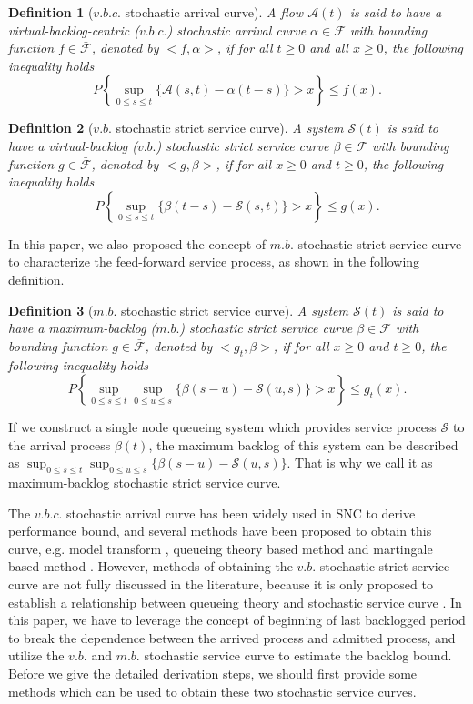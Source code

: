 \documentclass[12pt]{article}
\newtheorem{definition}{Definition}
\begin{document}
\begin{definition}[$v.b.c.$ stochastic arrival curve]
A flow $\mathcal{A}(t)$ is said to have a virtual-backlog-centric ($v.b.c.$) stochastic arrival curve $\alpha\in\mathcal{F}$ with bounding function $f\in\bar{\mathcal{F}}$, denoted by $<f,\alpha>$, if for all $t\geq 0$ and all $x\geq 0$, the following inequality holds
$$P\left\{\sup_{0\leq s\leq t}\{\mathcal{A}(s,t)-\alpha(t-s)\}>x\right\}\leq f(x).$$
\end{definition}

\begin{definition}[$v.b.$ stochastic strict service curve]
A system $\mathcal{S}(t)$ is said to have a virtual-backlog ($v.b.$) stochastic strict service curve $\beta\in\mathcal{F}$ with bounding function $g\in\bar{\mathcal{F}}$, denoted by $<g,\beta>$, if for all $x\geq 0$ and $t\geq 0$, the following inequality holds
$$P\left\{\sup_{0\leq s\leq t}\{\beta(t-s)-\mathcal{S}(s,t)\}>x\right\}\leq g(x).$$
\end{definition}

In this paper, we also proposed the concept of $m.b.$ stochastic strict service curve to characterize the feed-forward service process, as shown in the following definition.
\begin{definition}[$m.b.$ stochastic strict service curve]
A system $\mathcal{S}(t)$ is said to have a maximum-backlog ($m.b.$) stochastic strict service curve $\beta\in\mathcal{F}$ with bounding function $g\in\bar{\mathcal{F}}$, denoted by $<g_t,\beta>$, if for all $x\geq 0$ and $t\geq 0$, the following inequality holds
$$P\left\{\sup_{0\leq s\leq t}\sup_{0\leq u\leq s}\{\beta(s-u)-\mathcal{S}(u,s)\}>x\right\}\leq g_t(x).$$
\end{definition}

If we construct a single node queueing system which provides service process $\mathcal{S}$ to the arrival process $\beta(t)$, the maximum backlog of this system can be described as $\sup_{0\leq s\leq t}\sup_{0\leq u\leq s}\{\beta(s-u)-\mathcal{S}(u,s)\}$. That is why we call it as maximum-backlog stochastic strict service curve.

The $v.b.c.$ stochastic arrival curve has been widely used in SNC to derive performance bound, and several methods have been proposed to obtain this curve, e.g. model transform \cite{jiang2006basic,Wu2010Model,JiangLiu-15877}, queueing theory based method \cite{Wu2010Model} and martingale based method \cite{jiang2010note}. However, methods of obtaining the $v.b.$ stochastic strict service curve are not fully discussed in the literature, because it is only proposed to establish a relationship between queueing theory and stochastic service curve \cite{Wu2010Model}. In this paper, we have to leverage the concept of beginning of last backlogged period \cite{Fidl06} to break the dependence between the arrived process and admitted process, and utilize the $v.b.$ and $m.b.$ stochastic service curve to estimate the backlog bound. Before we give the detailed derivation steps, we should first provide some methods which can be used to obtain these two stochastic service curves.
\end{document}
